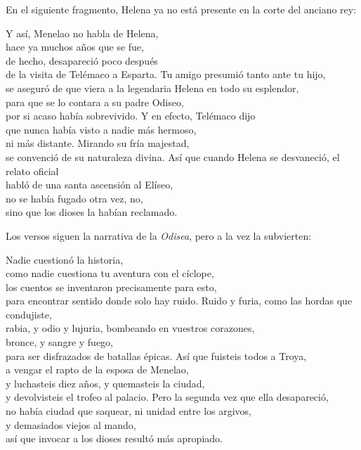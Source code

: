 En el siguiente fragmento, Helena ya no está presente en la corte del anciano rey:

\begin{versopropio}
Y así, Menelao no habla de Helena,\\
hace ya muchos años que se fue,\\
de hecho, desapareció poco después\\
de la visita de Telémaco a Esparta.
\stanzabreak
Tu amigo presumió tanto ante tu hijo,\\
se aseguró de que viera a la legendaria Helena en todo su esplendor,\\
para que se lo contara a su padre Odiseo,\\
por si acaso había sobrevivido.
\stanzabreak
Y en efecto, Telémaco dijo\\
que nunca había visto a nadie más hermoso,\\
ni más distante. Mirando su fría majestad,\\
se convenció de su naturaleza divina.
\stanzabreak
Así que cuando Helena se desvaneció, el relato oficial\\
habló de una santa ascensión al Elíseo,\\
no se había fugado otra vez, no,\\
sino que los dioses la habían reclamado.
\end{versopropio}

Los versos siguen la narrativa de la \emph{Odisea}, pero a la vez la subvierten:

\begin{versopropio}
Nadie cuestionó la historia,\\
como nadie cuestiona tu aventura con el cíclope,\\
los cuentos se inventaron precisamente para esto,\\
para encontrar sentido donde solo hay ruido.
\stanzabreak
Ruido y furia, como las hordas que condujiste,\\
rabia, y odio y lujuria, bombeando en vuestros corazones,\\
bronce, y sangre y fuego,\\
para ser disfrazados de batallas épicas.
\stanzabreak
Así que fuisteis todos a Troya,\\
a vengar el rapto de la esposa de Menelao,\\
y luchasteis diez años, y quemasteis la ciudad,\\
y devolvisteis el trofeo al palacio.
\stanzabreak
Pero la segunda vez que ella desapareció,\\
no había ciudad que saquear, ni unidad entre los argivos,\\
y demasiados viejos al mando,\\
así que invocar a los dioses resultó más apropiado.
\end{versopropio}

